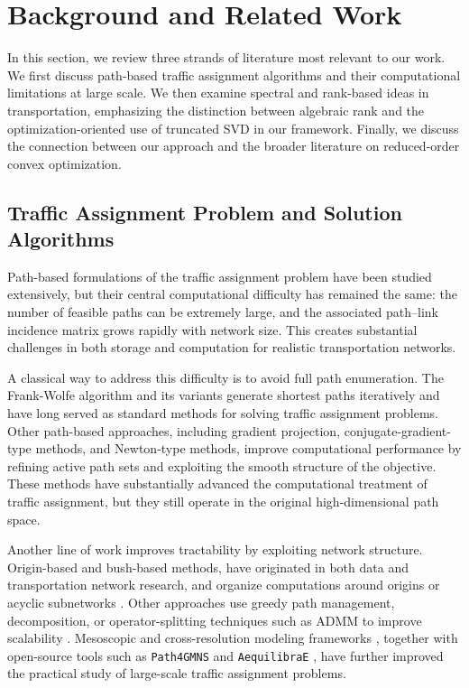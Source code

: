 \documentclass[11pt]{article}
\begin{document}
\section{Background and Related Work}\label{sec:background}

In this section, we review three strands of literature most relevant to our work. We first discuss path-based traffic assignment algorithms and their computational limitations at large scale. We then examine spectral and rank-based ideas in transportation, emphasizing the distinction between algebraic rank and the optimization-oriented use of truncated SVD in our framework. Finally, we discuss the connection between our approach and the broader literature on reduced-order convex optimization.

\subsection{Traffic Assignment Problem and Solution Algorithms}

Path-based formulations of the traffic assignment problem have been studied extensively, but their central computational difficulty has remained the same: the number of feasible paths can be extremely large, and the associated path--link incidence matrix grows rapidly with network size. This creates substantial challenges in both storage and computation for realistic transportation networks.

A classical way to address this difficulty is to avoid full path enumeration. The Frank-Wolfe algorithm and its variants generate shortest paths iteratively and have long served as standard methods for solving traffic assignment problems. Other path-based approaches, including gradient projection, conjugate-gradient-type methods, and Newton-type methods, improve computational performance by refining active path sets and exploiting the smooth structure of the objective. These methods have substantially advanced the computational treatment of traffic assignment, but they still operate in the original high-dimensional path space.

Another line of work improves tractability by exploiting network structure. Origin-based and bush-based methods, have originated in both data and transportation network research, and organize computations around origins or acyclic subnetworks \cite{gallager1977minimum,bertsekas1984second,bar2002origin,nie2010class}. Other approaches use greedy path management, decomposition, or operator-splitting techniques such as ADMM to improve scalability \cite{xie2018greedy, yao2019admm, liu2023alternating, liu2024novel, liu2025admm}. Mesoscopic and cross-resolution modeling frameworks \cite{zhou2014dtalite, zhou2022meso}, together with open-source tools such as \texttt{Path4GMNS} \cite{Path4GMNS} and \texttt{AequilibraE} \cite{camargo2015aequilibrae}, have further improved the practical study of large-scale traffic assignment problems.
\end{document}

